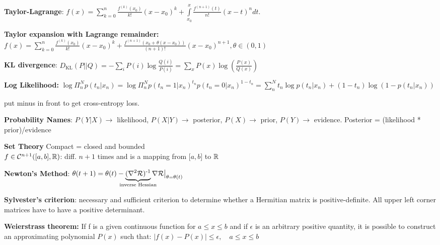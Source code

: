 \textbf{Taylor-Lagrange}:
$f(x)=\sum\limits^n_{k=0}\frac{f^{(k)}(x_0)}{k!}(x-x_0)^k+\int\limits^x_{x_0}\frac{f^{(n+1)}(t)}{n!}(x-t)^n dt$.

\textbf{Taylor expansion with Lagrange remainder:}\\
$f(x)=\sum\limits^n_{k=0}\frac{f^{(k)}(x_0)}{k!}(x-x_0)^k+\frac{f^{(n+1)}(x_0+\theta(x-x_0))}{(n+1)!}(x-x_0)^{n+1}, \theta\in(0,1)$

\textbf{KL divergence}: $D_\text{KL}(P||Q)=-\sum_i P(i) \log \frac{Q(i)}{P(i)}= \sum_{x} P(x) \log\left(\frac{P(x)}{Q(x)}\right)$


\textbf{Log Likelihood:} $\log\Pi^N_n p(t_n|x_n)=\log\Pi^N_n p(t_n=1|x_n)^{t_n} p(t_n=0|x_n)^{1-t_n}=\sum^N_n t_n \log p(t_n|x_n) + (1-t_n) \log (1-p(t_n|x_n))$

\tab put minus in front to get cross-entropy loss.

\textbf{Probability Names}: $P(Y|X)\xrightarrow{}$ likelihood, $P(X|Y)\xrightarrow{}$ posterior, $P(X)\xrightarrow{}$ prior, $P(Y)\xrightarrow{}$ evidence. Posterior = (likelihood * prior)/evidence

\textbf{Set Theory}
Compact = closed and bounded\\
$f\in\mathcal{C}^{n+1}(\lbrack a,b\rbrack,\mathbb R)$: diff. $n+1$ times and is a mapping from $\lbrack a,b\rbrack$ to $\mathbb R$

\textbf{Newton's Method}: $\theta(t+1)=\theta(t)-\!\!\!\!\!\underbrace{(\nabla^2\cR)\inv}_\text{inverse Hessian}\!\!\!\!\!\nabla\cR\bigr|_{\theta=\theta(t)}$

\textbf{Sylvester's criterion}: necessary and sufficient criterion to determine whether a Hermitian matrix is positive-definite. All upper left corner matrices have to have a positive determinant.


\textbf{Weierstrass theorem:} If f is a given  continuous  function for $a\leq x \leq b$ and if $\epsilon$ is an arbitrary positive quantity, it is possible to construct an approximating polynomial $P(x)$ such that: $|f(x)-P(x)|\leq \epsilon, \quad a\leq x\leq b$

